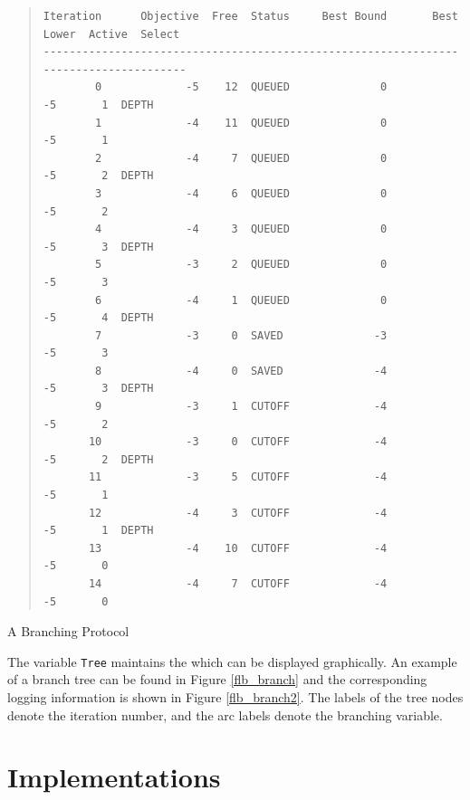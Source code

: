 \documentclass[a4paper,11pt,twoside]{book}
\begin{document}
\begin{multicols}{2}
\bigskip
\begin{figurehere}
\begin{quote}
{\tiny
\begin{verbatim}
Iteration      Objective  Free  Status     Best Bound       Best Lower  Active  Select
--------------------------------------------------------------------------------------
        0             -5    12  QUEUED              0               -5       1  DEPTH
        1             -4    11  QUEUED              0               -5       1
        2             -4     7  QUEUED              0               -5       2  DEPTH
        3             -4     6  QUEUED              0               -5       2
        4             -4     3  QUEUED              0               -5       3  DEPTH
        5             -3     2  QUEUED              0               -5       3
        6             -4     1  QUEUED              0               -5       4  DEPTH
        7             -3     0  SAVED              -3               -5       3
        8             -4     0  SAVED              -4               -5       3  DEPTH
        9             -3     1  CUTOFF             -4               -5       2
       10             -3     0  CUTOFF             -4               -5       2  DEPTH
       11             -3     5  CUTOFF             -4               -5       1
       12             -4     3  CUTOFF             -4               -5       1  DEPTH
       13             -4    10  CUTOFF             -4               -5       0
       14             -4     7  CUTOFF             -4               -5       0
\end{verbatim}
}
\end{quote}
\begin{center}
\caption{\label{flb_branch2}A Branching Protocol}
\end{center}
\end{figurehere}

\noindent
The variable \verb/Tree/ maintains the  which can be displayed
graphically. An example of a branch tree can be found in Figure \ref{flb_branch}
and the corresponding logging information is shown in Figure \ref{flb_branch2}.
The labels of the tree nodes denote the iteration number, and the arc labels
denote the branching variable.


\section{Implementations}


\end{multicols}
\end{document}
